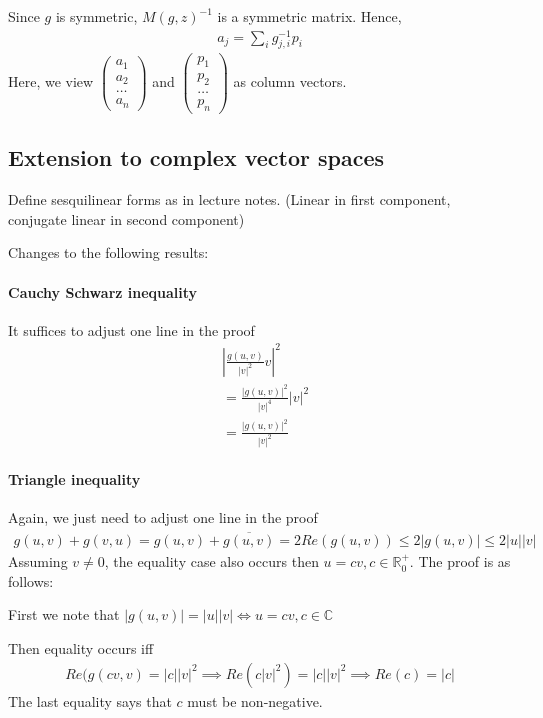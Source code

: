 \documentclass{article}
\begin{document}
Since $g$ is symmetric, $M(g,z)^{-1}$ is a symmetric matrix.
Hence, 
\begin{align*}
	a_j=\sum_i g^{-1}_{j,i}p_i 
\end{align*}
Here, we view $\begin{pmatrix}
a_1\\ a_2\\ \dots \\ a_n
\end{pmatrix}$ and $\begin{pmatrix}
p_1\\ p_2\\ \dots \\ p_n
\end{pmatrix}$ as column vectors.

\subsection{Extension to complex vector spaces}
Define sesquilinear forms as in lecture notes. (Linear in first component, conjugate linear in second component)

Changes to the following results:
\paragraph{Cauchy Schwarz inequality} It suffices to adjust one line in the proof
\begin{align*}
	&\left\lvert \frac{g(u,v)}{|v|^2}v \right\rvert^2\\
	&= \frac{|g(u,v)|^2}{|v|^4} |v|^2\\
	&= \frac{|g(u,v)|^2}{|v|^2}
\end{align*}

\paragraph{Triangle inequality} Again, we just need to adjust one line in the proof
\begin{align*}
	g(u,v) + g(v,u) = g(u,v) + \overline{g(u,v)} = 2Re(g(u,v))\leq 2|g(u,v)|\leq 2|u||v|
\end{align*}
Assuming $v\neq 0$, the equality case also occurs then $u=cv, c\in \mathbb{R}^+_0$. The proof is as follows:

First we note that $|g(u,v)|=|u||v|\iff u = cv, c\in \mathbb{C}$

Then equality occurs iff 
\begin{align*}
	Re(g(cv,v) = |c||v|^2\implies Re(c|v|^2)=|c||v|^2\implies Re(c)=|c|
\end{align*}
The last equality says that $c$ must be non-negative.
\end{document}
